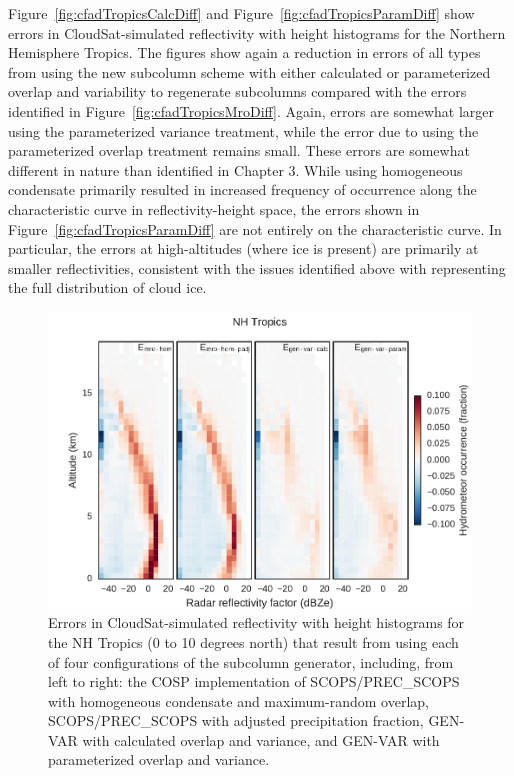 Figure~\ref{fig:cfadTropicsCalcDiff} and
Figure~\ref{fig:cfadTropicsParamDiff} show errors in CloudSat-simulated
reflectivity with height histograms for the Northern Hemisphere Tropics.
The figures show again a reduction in errors of all types from using the
new subcolumn scheme with either calculated or parameterized overlap and
variability to regenerate subcolumns compared with the errors identified
in Figure~\ref{fig:cfadTropicsMroDiff}. Again, errors are somewhat
larger using the parameterized variance treatment, while the error due
to using the parameterized overlap treatment remains small. These errors
are somewhat different in nature than identified in Chapter 3. While
using homogeneous condensate primarily resulted in increased frequency
of occurrence along the characteristic curve in reflectivity-height
space, the errors shown in Figure~\ref{fig:cfadTropicsParamDiff} are not
entirely on the characteristic curve. In particular, the errors at
high-altitudes (where ice is present) are primarily at smaller
reflectivities, consistent with the issues identified above with
representing the full distribution of cloud ice.

\begin{figure}[htbp]
\centering
\includegraphics{graphics/subgrid2_cfadDbze94_NHTropics_all_diff.pdf}
\caption{\label{fig:cfadTropicsAllDiff}Errors in CloudSat-simulated
reflectivity with height histograms for the NH Tropics (0 to 10 degrees
north) that result from using each of four configurations of the
subcolumn generator, including, from left to right: the COSP
implementation of SCOPS/PREC\_SCOPS with homogeneous condensate and
maximum-random overlap, SCOPS/PREC\_SCOPS with adjusted precipitation
fraction, GEN-VAR with calculated overlap and variance, and GEN-VAR with
parameterized overlap and variance.}\label{fig:cfadTropicsAllDiff}
\end{figure}

